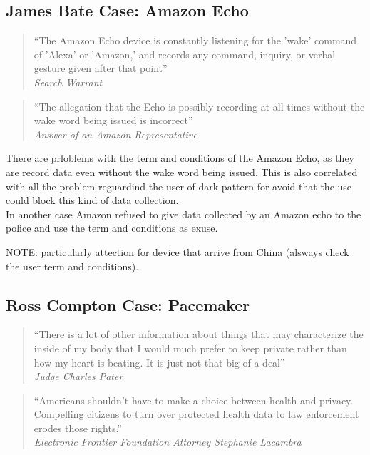 \subsection{James Bate Case: Amazon Echo}

\begin{multicols}{2}
    \begin{quote}
        “The Amazon Echo device is constantly listening for the 'wake' command of 'Alexa' or 'Amazon,' and records any command, inquiry, or verbal gesture given after that point”  \\
        \textit{Search Warrant}
    \end{quote}

    \begin{quote}
        “The allegation that the Echo is possibly recording at all times without the wake word being issued is incorrect”  \\
        \textit{Answer of an Amazon Representative}
    \end{quote}
\end{multicols}

There are prloblems with the term and conditions of the Amazon Echo, as they are record data even without the wake word being issued. This is also correlated with all the problem reguardind the user of dark pattern for avoid that the use could block this kind of data collection. \\
In another case Amazon refused to give data collected by an Amazon echo to the police and use the term and conditions as exuse. \bigskip

NOTE: particularly attection for device that arrive from China (alsways check the user term and conditions).

\subsection{Ross Compton Case: Pacemaker}

\begin{multicols}{2}
    \begin{quote}
        “There is a lot of other information about things that may characterize the inside of my body that I would much prefer to keep private rather than how my heart is beating. It is just not that big of a deal” \\ 
        \textit{Judge Charles Pater}
    \end{quote}

    \begin{quote}
        “Americans shouldn't have to make a choice between health and privacy. Compelling citizens to turn over protected health data to law enforcement erodes those rights.”  \\
        \textit{Electronic Frontier Foundation Attorney Stephanie Lacambra}
    \end{quote}
\end{multicols}

